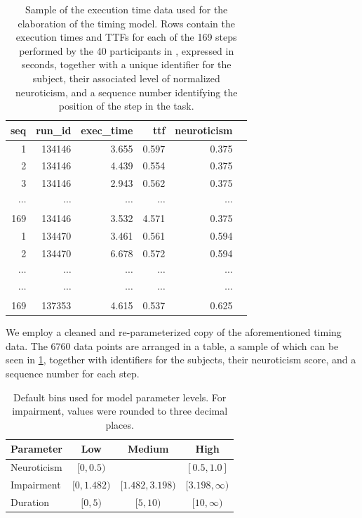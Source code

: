 \begin{table}
\centering
\caption[A]{%
    Sample of the execution time data  used for the elaboration of the timing model.
    Rows contain the execution times and \acp{TTF} for each of the \num{169} steps performed by the \num{40} participants in \textcite{olguinmunoz:impact2021}, expressed in seconds, together with a unique identifier for the subject, their associated level of normalized neuroticism, and a sequence number identifying the position of the step in the task.
}\label{tab:data:exectime}
\begin{tabular}{rrrrrr}
    \toprule
    {seq} & {run\_id} & {exec\_time} & {ttf} & {neuroticism}\\
    \midrule
    1 & 134146 & 3.655 & 0.597 & 0.375\\
    2 & 134146 & 4.439 & 0.554 & 0.375\\
    3 & 134146 & 2.943 & 0.562 & 0.375\\
    \( \cdots \) & \( \cdots \) & \( \cdots \) & \( \cdots \) & \( \cdots \) \\
    169 & 134146 & 3.532 & 4.571 & 0.375\\
    1 & 134470 & 3.461 & 0.561 & 0.594\\
    2 & 134470 & 6.678 & 0.572 & 0.594\\
    \( \cdots \) & \( \cdots \) & \( \cdots \) & \( \cdots \) & \( \cdots \) \\
    \( \cdots \) & \( \cdots \) & \( \cdots \) & \( \cdots \) & \( \cdots \) \\
    169 & 137353 & 4.615 & 0.537 & 0.625\\
    \bottomrule
    \end{tabular}
\end{table}

We employ a cleaned and re-parameterized copy of the aforementioned timing data.
The \num{6760} data points are arranged in a table, a sample of which can be seen in \cref{tab:data:exectime}, together with identifiers for the subjects, their neuroticism score, and a sequence number for each step.

\begin{table}[]
\centering
\caption{%
    Default bins used for model parameter levels.
    For impairment, values were rounded to three decimal places.
}
\label{tab:defaultbins}
\begin{tabular}{@{}lccc@{}}
\toprule
\textbf{Parameter} & \textbf{Low}     & \textbf{Medium}      & \textbf{High}         \\ \midrule
Neuroticism        & \( [0, 0.5) \)   &                      & \( [0.5, 1.0] \)      \\
Impairment         & \( [0, 1.482) \) & \( [1.482, 3.198) \) & \( [3.198, \infty) \) \\
Duration           & \( [0, 5) \)     & \( [5, 10) \)        & \( [10, \infty) \)    \\ \bottomrule
\end{tabular}%
\end{table}

